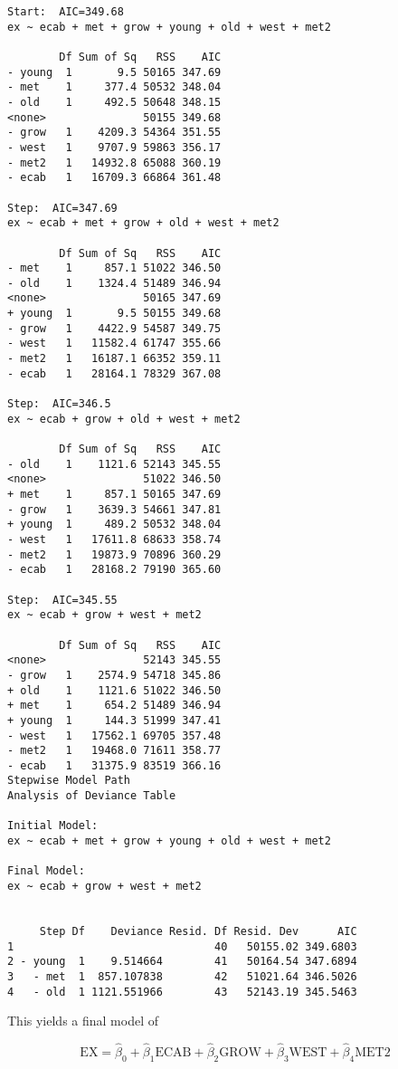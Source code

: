 \documentclass{article}
\begin{document}
    
    \begin{verbatim}
Start:  AIC=349.68
ex ~ ecab + met + grow + young + old + west + met2

        Df Sum of Sq   RSS    AIC
- young  1       9.5 50165 347.69
- met    1     377.4 50532 348.04
- old    1     492.5 50648 348.15
<none>               50155 349.68
- grow   1    4209.3 54364 351.55
- west   1    9707.9 59863 356.17
- met2   1   14932.8 65088 360.19
- ecab   1   16709.3 66864 361.48

Step:  AIC=347.69
ex ~ ecab + met + grow + old + west + met2

        Df Sum of Sq   RSS    AIC
- met    1     857.1 51022 346.50
- old    1    1324.4 51489 346.94
<none>               50165 347.69
+ young  1       9.5 50155 349.68
- grow   1    4422.9 54587 349.75
- west   1   11582.4 61747 355.66
- met2   1   16187.1 66352 359.11
- ecab   1   28164.1 78329 367.08

Step:  AIC=346.5
ex ~ ecab + grow + old + west + met2

        Df Sum of Sq   RSS    AIC
- old    1    1121.6 52143 345.55
<none>               51022 346.50
+ met    1     857.1 50165 347.69
- grow   1    3639.3 54661 347.81
+ young  1     489.2 50532 348.04
- west   1   17611.8 68633 358.74
- met2   1   19873.9 70896 360.29
- ecab   1   28168.2 79190 365.60

Step:  AIC=345.55
ex ~ ecab + grow + west + met2

        Df Sum of Sq   RSS    AIC
<none>               52143 345.55
- grow   1    2574.9 54718 345.86
+ old    1    1121.6 51022 346.50
+ met    1     654.2 51489 346.94
+ young  1     144.3 51999 347.41
- west   1   17562.1 69705 357.48
- met2   1   19468.0 71611 358.77
- ecab   1   31375.9 83519 366.16
Stepwise Model Path 
Analysis of Deviance Table

Initial Model:
ex ~ ecab + met + grow + young + old + west + met2

Final Model:
ex ~ ecab + grow + west + met2


     Step Df    Deviance Resid. Df Resid. Dev      AIC
1                               40   50155.02 349.6803
2 - young  1    9.514664        41   50164.54 347.6894
3   - met  1  857.107838        42   51021.64 346.5026
4   - old  1 1121.551966        43   52143.19 345.5463

    \end{verbatim}

    
    This yields a final model of

\begin{equation}
    \text{EX} = \hat{\beta}_0 +
                \hat{\beta}_1 \text{ECAB} +
                \hat{\beta}_2 \text{GROW} +
                \hat{\beta}_3 \text{WEST} +
                \hat{\beta}_4 \text{MET2}
\end{equation}
\end{document}
